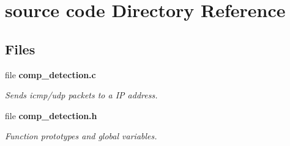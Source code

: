 \section{source code Directory Reference}
\label{dir_4cb6325948e15628ace1b41ec4dfca5a}
\subsection*{Files}
\begin{DoxyCompactItemize}
\item 
file {\bf comp\-\_\-detection.\-c}
\begin{DoxyCompactList}\small\item\em Sends icmp/udp packets to a I\-P address. \end{DoxyCompactList}\item 
file {\bf comp\-\_\-detection.\-h}
\begin{DoxyCompactList}\small\item\em Function prototypes and global variables. \end{DoxyCompactList}\end{DoxyCompactItemize}
